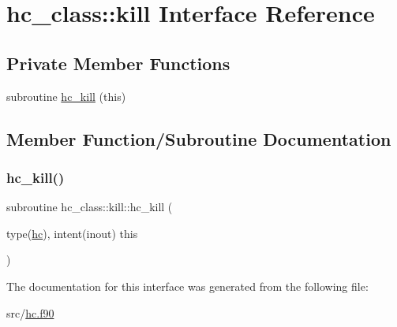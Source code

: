 \hypertarget{interfacehc__class_1_1kill}{}\section{hc\+\_\+class\+:\+:kill Interface Reference}
\label{interfacehc__class_1_1kill}
\subsection*{Private Member Functions}
\begin{DoxyCompactItemize}
\item 
subroutine \hyperlink{interfacehc__class_1_1kill_a05e977cf47d5345bb6b255b3bf85eb89}{hc\+\_\+kill} (this)
\end{DoxyCompactItemize}


\subsection{Member Function/\+Subroutine Documentation}
\mbox{\label{interfacehc__class_1_1kill_a05e977cf47d5345bb6b255b3bf85eb89}} 
\subsubsection{\texorpdfstring{hc\+\_\+kill()}{hc\_kill()}}
{\footnotesize\ttfamily subroutine hc\+\_\+class\+::kill\+::hc\+\_\+kill (\begin{DoxyParamCaption}\item[{type(\hyperlink{structhc__class_1_1hc}{hc}), intent(inout)}]{this }\end{DoxyParamCaption})\hspace{0.3cm}{\ttfamily [private]}}



The documentation for this interface was generated from the following file\+:\begin{DoxyCompactItemize}
\item 
src/\hyperlink{hc_8f90}{hc.\+f90}\end{DoxyCompactItemize}
